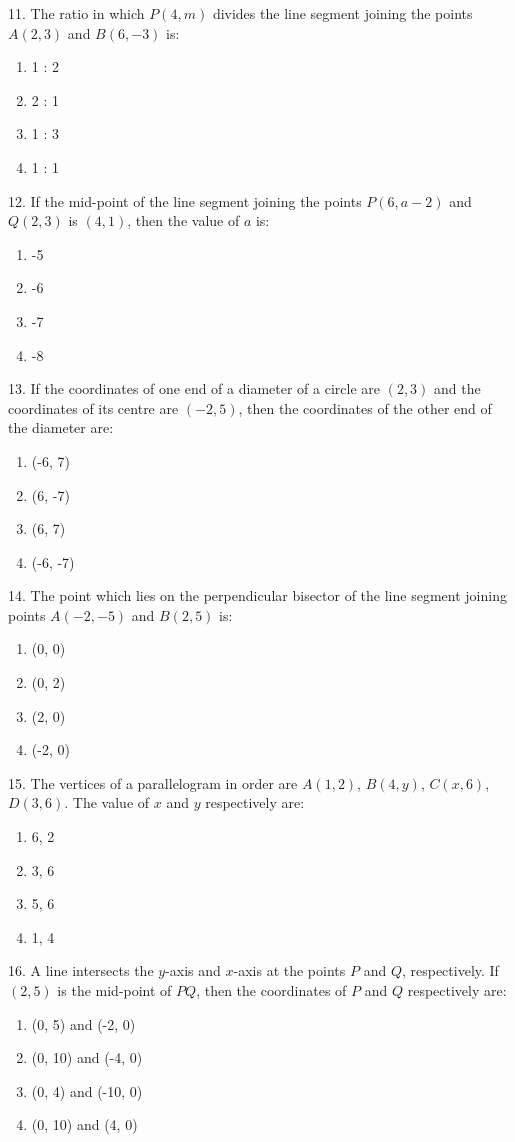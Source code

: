 \documentclass[12pt]{article}
\begin{document}
\begin{multicols}{2}
	11. The ratio in which $P(4, m)$ divides the line segment joining the points $A(2, 3)$ and $B(6, -3)$ is:
	\begin{enumerate}
		\item 1 : 2
		\item 2 : 1
		\item 1 : 3
		\item 1 : 1
	\end{enumerate}
	
	12. If the mid-point of the line segment joining the points $P(6, a-2)$ and $Q(2, 3)$ is $(4, 1)$, then the value of $a$ is:
	\begin{enumerate}
		\item -5
		\item -6
		\item -7
		\item -8
	\end{enumerate}
	
	13. If the coordinates of one end of a diameter of a circle are $(2, 3)$ and the coordinates of its centre are $(-2, 5)$, then the coordinates of the other end of the diameter are:
	\begin{enumerate}
		\item (-6, 7)
		\item (6, -7)
		\item (6, 7)
		\item (-6, -7)
	\end{enumerate}
	
	14. The point which lies on the perpendicular bisector of the line segment joining points $A(-2, -5)$ and $B(2, 5)$ is:
	\begin{enumerate}
		\item (0, 0)
		\item (0, 2)
		\item (2, 0)
		\item (-2, 0)
	\end{enumerate}
	
	15. The vertices of a parallelogram in order are $A(1, 2)$, $B(4, y)$, $C(x, 6)$, $D(3, 6)$. The value of $x$ and $y$ respectively are:
	\begin{enumerate}
		\item 6, 2
		\item 3, 6
		\item 5, 6
		\item 1, 4
	\end{enumerate}
	
	16. A line intersects the $y$-axis and $x$-axis at the points $P$ and $Q$, respectively. If $(2, 5)$ is the mid-point of $PQ$, then the coordinates of $P$ and $Q$ respectively are:
	\begin{enumerate}
		\item (0, 5) and (-2, 0)
		\item (0, 10) and (-4, 0)
		\item (0, 4) and (-10, 0)
		\item (0, 10) and (4, 0)
	\end{enumerate}
	

\end{multicols}
\end{document}
